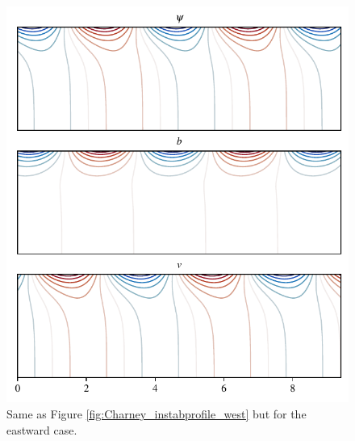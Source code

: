 \begin{figure}
    \centering
    \includegraphics{Charney_instabprofile_east}
    \caption{Same as Figure \ref{fig:Charney_instabprofile_west} but for the eastward case.}
    \label{fig:Charney_instabprofile_east}
\end{figure}